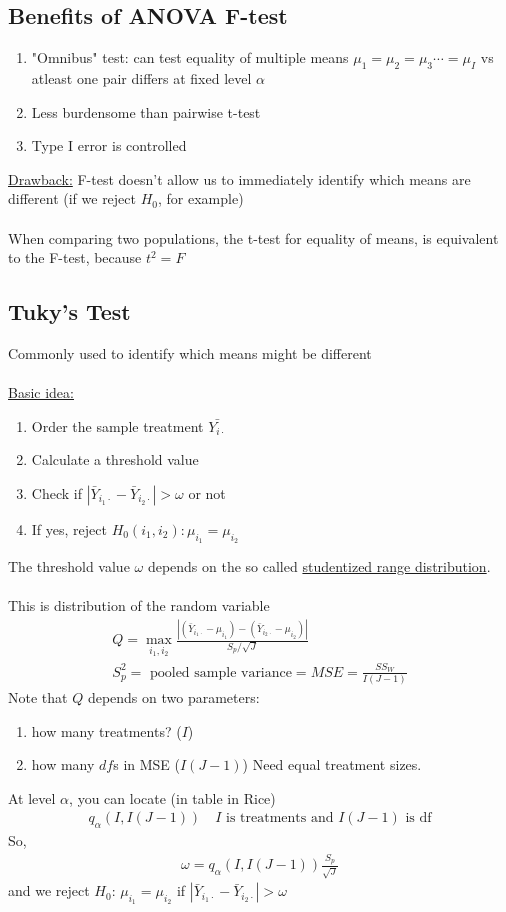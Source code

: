\subsection*{Benefits of ANOVA F-test}
\begin{enumerate}[label=\protect\circled{\alph*}]
	\item "Omnibus" test: can test equality of multiple means $\mu_1 = \mu_2 = \mu_3 \cdots = \mu_I$ vs atleast one pair differs at fixed level $\alpha$
	\item Less burdensome than pairwise t-test
	\item Type I error is controlled
\end{enumerate}
\underline{Drawback:} F-test doesn't allow us to immediately identify which means are different (if we reject $H_0$, for example)\\\\
When comparing two populations, the t-test for equality of means, is equivalent to the F-test, because $t^2 = F$
\subsection*{Tuky's Test}
Commonly used to identify which means might be different\\\\
\underline{Basic idea:}
\begin{enumerate}
	\item Order the sample treatment $\bar{Y_{i\cdot}}$
	\item Calculate a threshold value
	\item Check if $| \bar{Y}_{i_1 \cdot} - \bar{Y}_{i_2 \cdot} | > \omega$ or not
	\item If yes, reject $H_0 (i_1, i_2): \mu_{i_1} = \mu_{i_2}$
\end{enumerate}
The threshold value $\omega$ depends on the so called \underline{studentized range distribution}.\\\\
This is distribution of the random variable
\begin{gather*}
	Q = \underset{i_1, i_2}{\max} \frac{|(\bar{Y}_{i_1 \cdot} - \mu_{i_1}) - (\bar{Y}_{i_2 \cdot} - \mu_{i_2}) |}{S_p / \sqrt{J}}\\
	S_p^2 = \text{ pooled sample variance} = MSE = \frac{SS_W}{I(J-1)}
\end{gather*}
Note that $Q$ depends on two parameters:
\begin{enumerate}
	\item how many treatments? ($I$)
	\item how many $df$s in MSE ($I(J-1)$) Need equal treatment sizes.
\end{enumerate}
At level $\alpha$, you can locate (in table in Rice)
\begin{gather*}
	q_\alpha (I, I(J-1)) \quad I \text{ is treatments and } I(J-1) \text{ is df}
\end{gather*}
So,
\begin{gather*}
	\omega = q_\alpha (I, I(J-1)) \frac{S_p}{\sqrt{J}}
\end{gather*}
and we reject $H_0$: $\mu_{i_1} = \mu_{i_2}$ if $| \bar{Y}_{i_1 \cdot} - \bar{Y}_{i_2 \cdot} | > \omega$